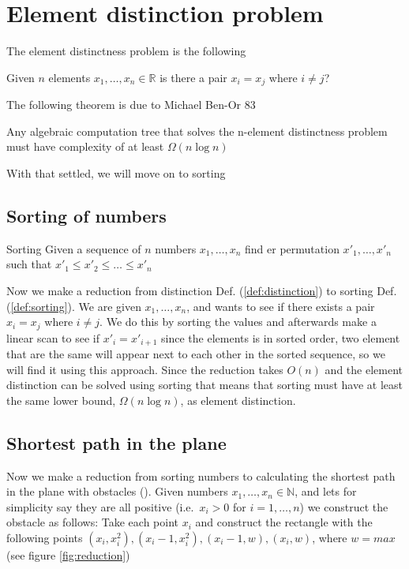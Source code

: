 \section{Element distinction problem}

The element distinctness problem is the following
\begin{mydef}
	\label{def:distinction}
	Given $n$ elements $x_1,\dots,x_n\in \mathbb{R}$ is there a pair $x_i=x_j$
	where $i\neq j$?
\end{mydef}

The following theorem is due to Michael Ben-Or 83\cite{DBLP:conf/stoc/Ben-Or83}

\begin{theorem}
	\label{thm:distinction_lower}
Any algebraic computation tree that solves the n-element distinctness problem
must have complexity of at least $\Omega{(n \log n)}$
\end{theorem}

With that settled, we will move on to sorting

\subsection{Sorting of numbers}

\begin{mydef}{Sorting}
	\label{def:sorting}
Given a sequence of $n$ numbers $x_1,\dots,x_n$ find er permutation
	$x'_1,\dots,x'_n$ such that  $x'_1\leq x'_2 \leq\dots\leq x'_n$
\end{mydef}

Now we make a reduction from distinction Def. (\ref{def:distinction}) to
sorting Def. (\ref{def:sorting}).  We are given $x_1,\dots, x_n$, and wants to
see if there exists a pair $x_i=x_j$ where $i\neq j$. We do this by sorting the
values and afterwards make a linear scan to see if $x'_i=x'_{i+1}$ since the
elements is in sorted order, two element that are the same will appear next to
each other in the sorted sequence, so we will find it using this approach.
Since the reduction takes $O(n)$ and the element distinction can be solved
using sorting that means that sorting must have at least the same lower bound,
$\Omega(n\log n)$, as element distinction. 

\subsection{Shortest path in the plane}
Now we make a reduction from sorting numbers to calculating the shortest path
in the plane with obstacles ().
Given numbers $x_1,\dots,x_n\in \mathbb{N}$, and lets for simplicity say they are all positive
(i.e.\ $x_i>0$ for $i=1,\dots,n$) we construct the obstacle as follows: Take each
point $x_i$ and construct the rectangle with the following points
$(x_i,x_i^2),(x_i-1,x_i^2),(x_i-1,w), (x_i,w)$, where $w=max$ (see figure
\ref{fig:reduction})

